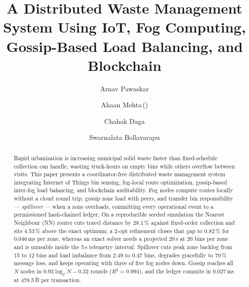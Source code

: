 \documentclass{llncs}
\begin{document}
\title{A Distributed Waste Management System Using IoT, Fog Computing,
       Gossip-Based Load Balancing, and Blockchain}


\author{Arnav Pawaskar \and
        Ahaan Mehta\,(\Letter) \and
        Chahak Daga \and
        Swarnalata Bollavarapu}



\maketitle

\begin{abstract}
Rapid urbanization is increasing municipal solid waste faster than
fixed-schedule collection can handle, wasting truck-hours on empty bins while
others overflow between visits. This paper presents a coordinator-free
distributed waste management system integrating Internet of Things bin sensing,
fog-local route optimization, gossip-based inter-fog load balancing, and
blockchain auditability. Fog nodes compute routes locally without a cloud round
trip, gossip zone load with peers, and transfer bin responsibility ---
\emph{spillover} --- when a zone overloads, committing every operational event
to a permissioned hash-chained ledger. On a reproducible seeded simulation the
Nearest Neighbour (NN) router cuts travel distance by 28.1\,\% against
fixed-order collection and sits 4.53\,\% above the exact optimum; a 2-opt
refinement closes that gap to 0.82\,\% for 0.046\,ms per zone, whereas an exact
solver needs a projected 20\,s at 20 bins per zone and is unusable inside the
5\,s telemetry interval. Spillover cuts peak zone backlog from 15 to 12 bins
and load imbalance from 2.49 to 0.47 bins, degrades gracefully to 70\,\%
message loss, and keeps operating with three of five fog nodes down. Gossip
reaches all $N$ nodes in $0.93\log_2 N - 0.32$ rounds ($R^2=0.994$), and the
ledger commits in 0.027\,ms at 478.5\,B per transaction.

\end{abstract}
\end{document}
